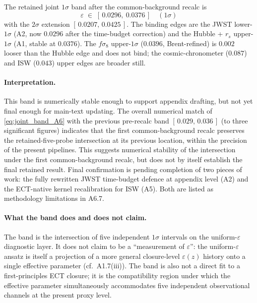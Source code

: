 The retained joint $1\sigma$ band after the common-background
recalc is
\begin{equation}
\varepsilon
\;\in\;
[\,0.0296,\ 0.0376\,]
\quad (1\sigma)
\label{eq:joint_band_A6}
\end{equation}
with the $2\sigma$ extension $[\,0.0207,\,0.0425\,]$. The binding
edges are the JWST lower-$1\sigma$ (A2, now $0.0296$ after the
time-budget correction) and the Hubble + $r_s$ upper-$1\sigma$
(A1, stable at $0.0376$). The $f\sigma_8$ upper-$1\sigma$
($0.0396$, Brent-refined) is $0.002$ looser than the Hubble edge
and does not bind; the cosmic-chronometer ($0.087$) and ISW
($0.043$) upper edges are broader still.

\paragraph{Interpretation.}
This band is numerically stable enough to support appendix
drafting, but not yet final enough for main-text updating. The
overall numerical match of \eqref{eq:joint_band_A6} with the
previous pre-recalc band $[\,0.029,\,0.036\,]$ (to three
significant figures) indicates that the first common-background
recalc preserves the retained-five-probe intersection at its
previous location, within the precision of the present
pipelines. This suggests numerical stability of the intersection
under the first common-background recalc, but does not by itself
establish the final retained result. Final confirmation is
pending completion of two pieces of work: the fully rewritten
JWST time-budget defence at appendix level (A2) and the
ECT-native kernel recalibration for ISW (A5). Both are listed as
methodology limitations in A6.7.

\paragraph{What the band does and does not claim.}
The band is the intersection of five independent $1\sigma$
intervals on the uniform-$\varepsilon$ diagnostic layer. It does
not claim to be a ``measurement of $\varepsilon$'': the
uniform-$\varepsilon$ ansatz is itself a projection of a more
general closure-level $\varepsilon(z)$ history onto a single
effective parameter (cf.\ A1.7(iii)). The band is also not a
direct fit to a first-principles ECT closure; it is the
compatibility region under which the effective parameter
simultaneously accommodates five independent observational
channels at the present proxy level.

